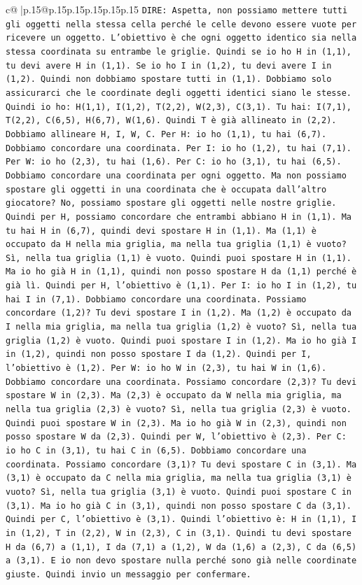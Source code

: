 \documentclass{article}
\begin{document}
{\begin{supertabular}{c@{$\;$}|p{.15\linewidth}@{}p{.15\linewidth}p{.15\linewidth}p{.15\linewidth}p{.15\linewidth}p{.15\linewidth}}
{{{\texttt{DIRE: Aspetta, non possiamo mettere tutti gli oggetti nella stessa cella perché le celle devono essere vuote per ricevere un oggetto. L'obiettivo è che ogni oggetto identico sia nella stessa coordinata su entrambe le griglie. Quindi se io ho H in (1,1), tu devi avere H in (1,1). Se io ho I in (1,2), tu devi avere I in (1,2). Quindi non dobbiamo spostare tutti in (1,1). Dobbiamo solo assicurarci che le coordinate degli oggetti identici siano le stesse. Quindi io ho: H(1,1), I(1,2), T(2,2), W(2,3), C(3,1). Tu hai: I(7,1), T(2,2), C(6,5), H(6,7), W(1,6). Quindi T è già allineato in (2,2). Dobbiamo allineare H, I, W, C. Per H: io ho (1,1), tu hai (6,7). Dobbiamo concordare una coordinata. Per I: io ho (1,2), tu hai (7,1). Per W: io ho (2,3), tu hai (1,6). Per C: io ho (3,1), tu hai (6,5). Dobbiamo concordare una coordinata per ogni oggetto. Ma non possiamo spostare gli oggetti in una coordinata che è occupata dall'altro giocatore? No, possiamo spostare gli oggetti nelle nostre griglie. Quindi per H, possiamo concordare che entrambi abbiano H in (1,1). Ma tu hai H in (6,7), quindi devi spostare H in (1,1). Ma (1,1) è occupato da H nella mia griglia, ma nella tua griglia (1,1) è vuoto? Sì, nella tua griglia (1,1) è vuoto. Quindi puoi spostare H in (1,1). Ma io ho già H in (1,1), quindi non posso spostare H da (1,1) perché è già lì. Quindi per H, l'obiettivo è (1,1). Per I: io ho I in (1,2), tu hai I in (7,1). Dobbiamo concordare una coordinata. Possiamo concordare (1,2)? Tu devi spostare I in (1,2). Ma (1,2) è occupato da I nella mia griglia, ma nella tua griglia (1,2) è vuoto? Sì, nella tua griglia (1,2) è vuoto. Quindi puoi spostare I in (1,2). Ma io ho già I in (1,2), quindi non posso spostare I da (1,2). Quindi per I, l'obiettivo è (1,2). Per W: io ho W in (2,3), tu hai W in (1,6). Dobbiamo concordare una coordinata. Possiamo concordare (2,3)? Tu devi spostare W in (2,3). Ma (2,3) è occupato da W nella mia griglia, ma nella tua griglia (2,3) è vuoto? Sì, nella tua griglia (2,3) è vuoto. Quindi puoi spostare W in (2,3). Ma io ho già W in (2,3), quindi non posso spostare W da (2,3). Quindi per W, l'obiettivo è (2,3). Per C: io ho C in (3,1), tu hai C in (6,5). Dobbiamo concordare una coordinata. Possiamo concordare (3,1)? Tu devi spostare C in (3,1). Ma (3,1) è occupato da C nella mia griglia, ma nella tua griglia (3,1) è vuoto? Sì, nella tua griglia (3,1) è vuoto. Quindi puoi spostare C in (3,1). Ma io ho già C in (3,1), quindi non posso spostare C da (3,1). Quindi per C, l'obiettivo è (3,1). Quindi l'obiettivo è: H in (1,1), I in (1,2), T in (2,2), W in (2,3), C in (3,1). Quindi tu devi spostare H da (6,7) a (1,1), I da (7,1) a (1,2), W da (1,6) a (2,3), C da (6,5) a (3,1). E io non devo spostare nulla perché sono già nelle coordinate giuste. Quindi invio un messaggio per confermare.} \\
}}}
\end{supertabular}}
\end{document}
